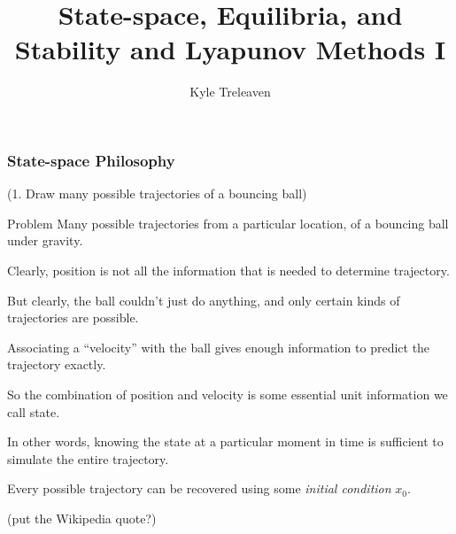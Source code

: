 \documentclass[12pt]{beamer}
\author{Kyle Treleaven}
\title{State-space, Equilibria, and Stability and Lyapunov Methods I}
\begin{document}
\begin{frame}
\titlepage

\end{frame}



\begin{frame}
\frametitle{State-space Philosophy}

(1. Draw many possible trajectories of a bouncing ball)

\begin{block}{Problem}
Many possible trajectories from a particular location, of a bouncing ball under gravity.
\end{block}


\end{frame}


\begin{frame}

\begin{itemize}

\vitem Clearly, position is not all the information that is needed to determine trajectory.

\vitem But clearly, the ball couldn't just do anything, and only certain kinds of trajectories are possible.

\end{itemize}

\end{frame}



\begin{frame}
\begin{itemize}
\vitem Associating a ``velocity'' with the ball gives enough information to predict the trajectory exactly.

\vitem So the combination of position and velocity is some essential unit information we call state.

\vitem In other words, knowing the state at a particular moment in time is sufficient to simulate the entire trajectory.

\vitem Every possible trajectory can be recovered using some \emph{initial condition} $x_0$.
\end{itemize}

(put the Wikipedia quote?)

\vfill\null

\end{frame}
\end{document}
